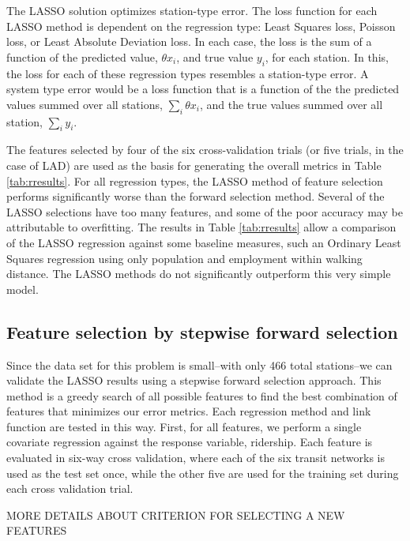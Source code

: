 \documentclass[11pt]{article}
\begin{document}
The LASSO solution optimizes station-type error. The loss function for each LASSO method is dependent on the regression type: Least Squares loss, Poisson loss, or Least Absolute Deviation loss. In each case, the loss is the sum of a function of the predicted value, $\theta x_i$, and true value $y_i$, for each station. In this, the loss for each of these regression types resembles a station-type error. A system type error would be a loss function that is a function of the the predicted values summed over all stations, $\sum_i \theta x_i$, and the true values summed over all station, $\sum_i y_i$.

The features selected by four of the six cross-validation trials (or five trials, in the case of LAD) are used as the basis for generating the overall metrics in Table \ref{tab:rresults}. For all regression types, the LASSO method of feature selection performs significantly worse than the forward selection method. Several of the LASSO selections have too many features, and some of the poor accuracy may be attributable to overfitting. The results in Table \ref{tab:rresults} allow a comparison of the LASSO regression against some baseline measures, such an Ordinary Least Squares regression using only population and employment within walking distance. The LASSO methods do not significantly outperform this very simple model.


\subsection{Feature selection by stepwise forward selection}\label{sec:fs}


Since the data set for this problem is small--with only 466 total stations--we can validate the LASSO results using a stepwise forward selection approach. This method is a greedy search of all possible features to find the best combination of features that minimizes our error metrics. Each regression method and link function are tested in this way. First, for all features, we perform a single covariate regression against the response variable, ridership. Each feature is evaluated in six-way cross validation, where each of the six transit networks is used as the test set once, while the other five are used for the training set during each cross validation trial.


MORE DETAILS ABOUT CRITERION FOR SELECTING A NEW FEATURES
\end{document}
